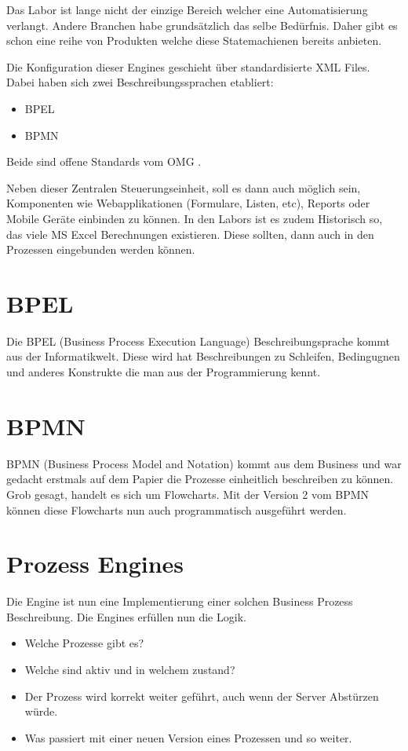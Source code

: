 \documentclass[paper=a4,twoside=false,BCOR=0mm,DIV=calc,fontsize=12pt]{scrartcl}
\begin{document}
Das Labor ist lange nicht der einzige Bereich welcher eine Automatisierung verlangt. Andere Branchen habe grundsätzlich das selbe
Bedürfnis. Daher gibt es schon eine reihe von Produkten welche diese Statemachienen bereits anbieten.

Die Konfiguration dieser Engines geschieht über standardisierte XML Files. Dabei haben sich zwei Beschreibungssprachen etabliert:
\begin{itemize}
 \item BPEL
 \item BPMN
\end{itemize}

Beide sind offene Standards vom OMG \cite{omg}.

Neben dieser Zentralen Steuerungseinheit, soll es dann auch möglich sein, Komponenten wie Webapplikationen (Formulare, Listen, etc),
Reports oder Mobile Geräte einbinden zu können. In den Labors ist es zudem Historisch so, das viele MS Excel Berechnungen existieren. Diese
sollten, dann auch in den Prozessen eingebunden werden können.


\section{BPEL}
Die BPEL (Business Process Execution Language) Beschreibungsprache kommt aus der Informatikwelt. Diese wird hat Beschreibungen zu
Schleifen, Bedingugnen und anderes Konstrukte die man aus der Programmierung kennt. 


\section{BPMN}
BPMN (Business Process Model and Notation) kommt aus dem Business und war gedacht erstmals auf dem Papier die Prozesse einheitlich
beschreiben zu können. Grob gesagt, handelt es sich um Flowcharts. 
Mit der Version 2 vom BPMN können diese Flowcharts nun auch programmatisch ausgeführt werden. 




\section{Prozess Engines}
Die Engine ist nun eine Implementierung einer solchen Business Prozess Beschreibung. Die Engines erfüllen nun die Logik. 
\begin{itemize}
  \item Welche Prozesse gibt es?
  \item Welche sind aktiv und in welchem zustand?
  \item Der Prozess wird korrekt weiter geführt, auch wenn der Server Abstürzen würde.
  \item Was passiert mit einer neuen Version eines Prozessen und so weiter.                      
\end{itemize}
\end{document}
